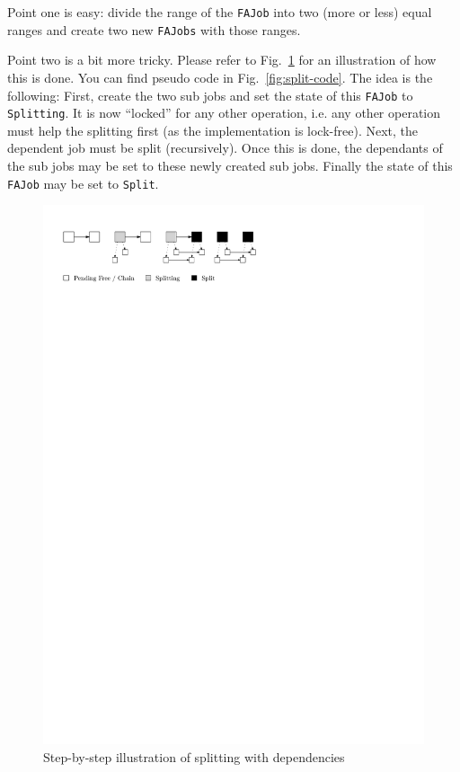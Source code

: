 \documentclass[runningheads,a4paper,fleqn]{llncs}
\begin{document}
Point one is easy: divide the range of the \texttt{FAJob} into two
(more or less) equal ranges and create two new \texttt{FAJobs} with
those ranges.

Point two is a bit more tricky. Please refer to
Fig.~\ref{fig:split-ill}
for an illustration of how this is done. You can find pseudo code in
Fig.~\ref{fig:split-code}. The idea is the following: First, create the
two sub jobs and set the state of this \texttt{FAJob} to
\texttt{Splitting}. It is now ``locked'' for any other operation,
i.e. any
other operation must help the splitting first (as the implementation
is lock-free). Next, the dependent job must be split
(recursively). Once this is done, the dependants of the sub jobs may be
set to these newly created sub jobs. Finally the state of this
\texttt{FAJob} may be set to \texttt{Split}.

\begin{figure}
  \centering
  \includegraphics[trim = 0mm 18mm 0mm 0mm, clip]{split}
  \caption{Step-by-step illustration of splitting with dependencies}
  \label{fig:split-ill}
\end{figure}
\end{document}
